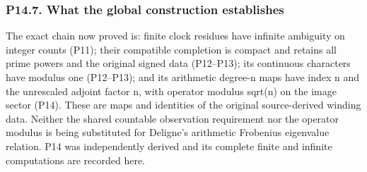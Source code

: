 \documentclass[
  11pt,
]{article}
\begin{document}
\subsubsection{P14.7. What the global construction
establishes}\label{p14.7.-what-the-global-construction-establishes}

The exact chain now proved is: finite clock residues have infinite
ambiguity on integer counts (P11); their compatible completion is
compact and retains all prime powers and the original signed data
(P12--P13); its continuous characters have modulus one (P12--P13); and
its arithmetic degree-n maps have index n and the unrescaled adjoint
factor n, with operator modulus sqrt(n) on the image sector (P14). These
are maps and identities of the original source-derived winding data.
Neither the shared countable observation requirement nor the operator
modulus is being substituted for Deligne's arithmetic Frobenius
eigenvalue relation. P14 was independently derived and its complete
finite and infinite computations are recorded here.
\end{document}
